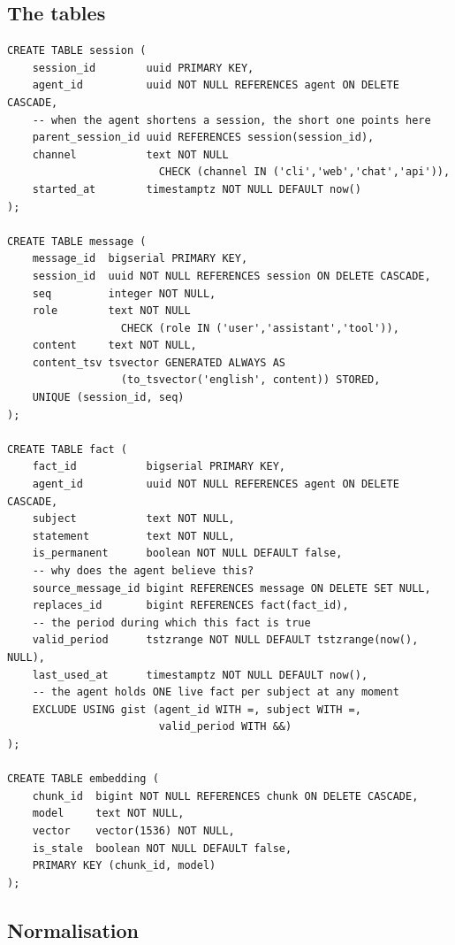 \documentclass[11pt,a4paper]{article}
\begin{document}
\subsection{The tables}

\begin{lstlisting}[style=sql,caption={The core tables in PostgreSQL.}]
CREATE TABLE session (
    session_id        uuid PRIMARY KEY,
    agent_id          uuid NOT NULL REFERENCES agent ON DELETE CASCADE,
    -- when the agent shortens a session, the short one points here
    parent_session_id uuid REFERENCES session(session_id),
    channel           text NOT NULL
                        CHECK (channel IN ('cli','web','chat','api')),
    started_at        timestamptz NOT NULL DEFAULT now()
);

CREATE TABLE message (
    message_id  bigserial PRIMARY KEY,
    session_id  uuid NOT NULL REFERENCES session ON DELETE CASCADE,
    seq         integer NOT NULL,
    role        text NOT NULL
                  CHECK (role IN ('user','assistant','tool')),
    content     text NOT NULL,
    content_tsv tsvector GENERATED ALWAYS AS
                  (to_tsvector('english', content)) STORED,
    UNIQUE (session_id, seq)
);

CREATE TABLE fact (
    fact_id           bigserial PRIMARY KEY,
    agent_id          uuid NOT NULL REFERENCES agent ON DELETE CASCADE,
    subject           text NOT NULL,
    statement         text NOT NULL,
    is_permanent      boolean NOT NULL DEFAULT false,
    -- why does the agent believe this?
    source_message_id bigint REFERENCES message ON DELETE SET NULL,
    replaces_id       bigint REFERENCES fact(fact_id),
    -- the period during which this fact is true
    valid_period      tstzrange NOT NULL DEFAULT tstzrange(now(), NULL),
    last_used_at      timestamptz NOT NULL DEFAULT now(),
    -- the agent holds ONE live fact per subject at any moment
    EXCLUDE USING gist (agent_id WITH =, subject WITH =,
                        valid_period WITH &&)
);

CREATE TABLE embedding (
    chunk_id  bigint NOT NULL REFERENCES chunk ON DELETE CASCADE,
    model     text NOT NULL,
    vector    vector(1536) NOT NULL,
    is_stale  boolean NOT NULL DEFAULT false,
    PRIMARY KEY (chunk_id, model)
);
\end{lstlisting}

\subsection{Normalisation}
\end{document}
